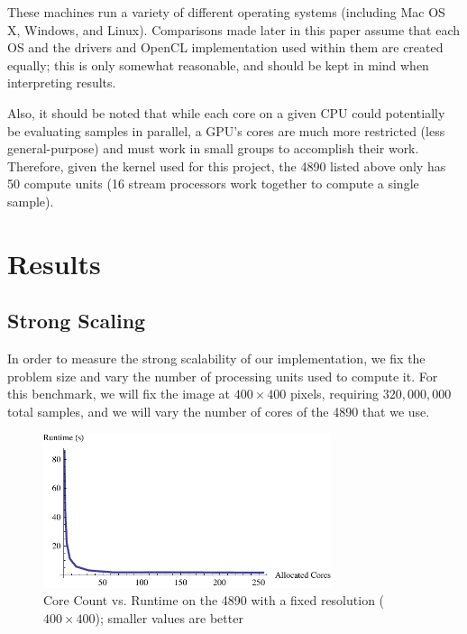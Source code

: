 \documentclass{acmsiggraph}
\begin{document}
These machines run a variety of different operating systems (including Mac OS X, Windows, and Linux). Comparisons made later in this paper assume that each OS and the drivers and OpenCL implementation used within them are created equally; this is only somewhat reasonable, and should be kept in mind when interpreting results.

Also, it should be noted that while each core on a given CPU could potentially be evaluating samples in parallel, a GPU's cores are much more restricted (less general-purpose) and must work in small groups to accomplish their work. Therefore, given the kernel used for this project, the 4890 listed above only has 50 compute units (16 stream processors work together to compute a single sample).

\section{Results}

\subsection{Strong Scaling}

\label{strongScaling}

In order to measure the strong scalability of our implementation, we fix the problem size and vary the number of processing units used to compute it. For this benchmark, we will fix the image at $400\times400$ pixels, requiring $320,000,000$ total samples, and we will vary the number of cores of the 4890 that we use.

\begin{figure}
    \includegraphics[width=84.5mm]{strongPlotOne.pdf}
    \caption{Core Count vs. Runtime on the 4890 with a fixed resolution ($400\times400$); smaller values are better}
    \label{fig:strongPlotOne}
\end{figure}
\end{document}
